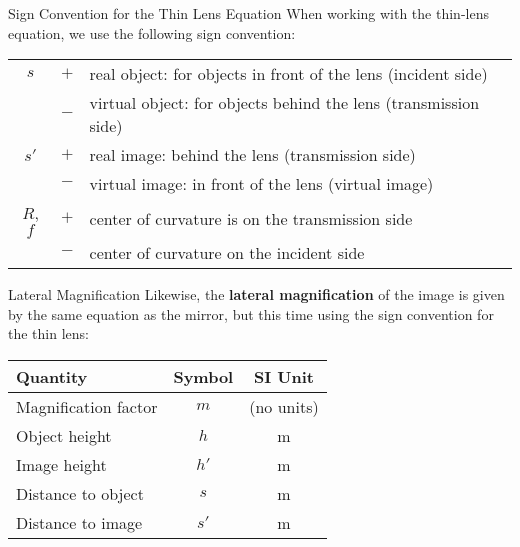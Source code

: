 \documentclass[12pt,compress,aspectratio=169]{beamer}
\begin{document}
\begin{frame}{Sign Convention for the Thin Lens Equation}
  When working with the thin-lens equation, we use the following sign
  convention:
  
  \begin{center}
    \begin{tabular}{ccl}
      \hline
      $s$ & $+$ & real object: for objects in front of the lens (incident
      side) \\
      & $-$ & virtual object: for objects behind the lens (transmission side)
      \\\hline
      $s'$ & $+$ & real image: behind the lens (transmission side)\\
      & $-$ & virtual image: in front of the lens (virtual image)\\\hline
      $R$, $f$ & $+$ & center of curvature is on the transmission side\\
      & $-$ & center of curvature on the incident side\\
      \hline
    \end{tabular}
  \end{center}
\end{frame}



\begin{frame}{Lateral Magnification}
  Likewise, the  \textbf{lateral magnification} of the image is given by the
  same equation as the mirror, but this time using the sign convention for
  the thin lens:

  \begin{center}
    \begin{tabular}{l|c|c}
      \rowcolor{pink}
      \textbf{Quantity} & \textbf{Symbol} & \textbf{SI Unit} \\ \hline
      Magnification factor & $m$ & (no units)\\
      Object height & $h$  & \si{\metre} \\
      Image height  & $h'$ & \si{\metre} \\
      Distance to object & $s$  & \si{\metre} \\
      Distance to image  & $s'$ & \si{\metre}
    \end{tabular}
  \end{center}
\end{frame}
\end{document}
